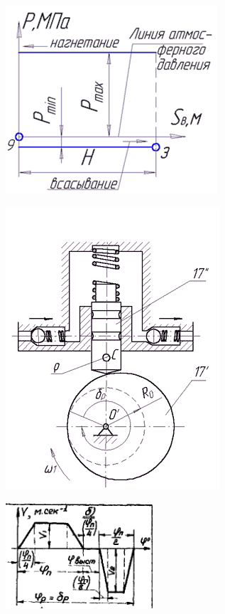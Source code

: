 \begin{figure}[h!]
	\centering
	\includegraphics[width=0.3\linewidth]{pic/pressure}
	\caption{}
	\label{pic_ind_diagram}
\end{figure}

\begin{figure}[h!]
	\centering
	\includegraphics[width=0.4\linewidth]{pic/pump}
	\caption{}
	\label{pic_oil_pump}
\end{figure}

\begin{figure}
	\centering
	\includegraphics{pic/v(varphi)}
	\caption{}
	\label{pic_mov_push}
\end{figure}
